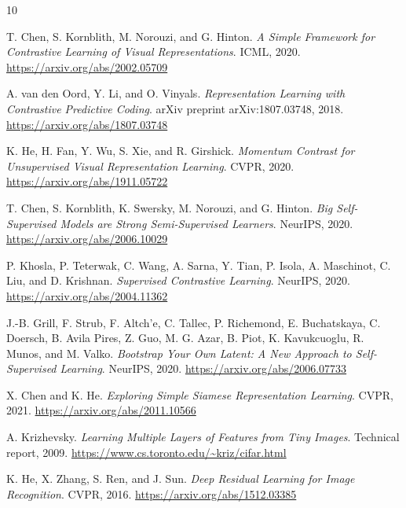 \documentclass[10pt]{article}
\begin{document}
\begin{thebibliography}{10}

T. Chen, S. Kornblith, M. Norouzi, and G. Hinton.
\textit{A Simple Framework for Contrastive Learning of Visual Representations}.
ICML, 2020.
\url{https://arxiv.org/abs/2002.05709}

A. van den Oord, Y. Li, and O. Vinyals.
\textit{Representation Learning with Contrastive Predictive Coding}.
arXiv preprint arXiv:1807.03748, 2018.
\url{https://arxiv.org/abs/1807.03748}

K. He, H. Fan, Y. Wu, S. Xie, and R. Girshick.
\textit{Momentum Contrast for Unsupervised Visual Representation Learning}.
CVPR, 2020.
\url{https://arxiv.org/abs/1911.05722}

T. Chen, S. Kornblith, K. Swersky, M. Norouzi, and G. Hinton.
\textit{Big Self-Supervised Models are Strong Semi-Supervised Learners}.
NeurIPS, 2020.
\url{https://arxiv.org/abs/2006.10029}

P. Khosla, P. Teterwak, C. Wang, A. Sarna, Y. Tian, P. Isola, A. Maschinot, C. Liu, and D. Krishnan.
\textit{Supervised Contrastive Learning}.
NeurIPS, 2020.
\url{https://arxiv.org/abs/2004.11362}

J.-B. Grill, F. Strub, F. Altch'e, C. Tallec, P. Richemond, E. Buchatskaya, C. Doersch, B. Avila Pires, Z. Guo, M. G. Azar, B. Piot, K. Kavukcuoglu, R. Munos, and M. Valko.
\textit{Bootstrap Your Own Latent: A New Approach to Self-Supervised Learning}.
NeurIPS, 2020.
\url{https://arxiv.org/abs/2006.07733}

X. Chen and K. He.
\textit{Exploring Simple Siamese Representation Learning}.
CVPR, 2021.
\url{https://arxiv.org/abs/2011.10566}

A. Krizhevsky.
\textit{Learning Multiple Layers of Features from Tiny Images}.
Technical report, 2009.
\url{https://www.cs.toronto.edu/~kriz/cifar.html}

K. He, X. Zhang, S. Ren, and J. Sun.
\textit{Deep Residual Learning for Image Recognition}.
CVPR, 2016.
\url{https://arxiv.org/abs/1512.03385}

\end{thebibliography}
\end{document}

